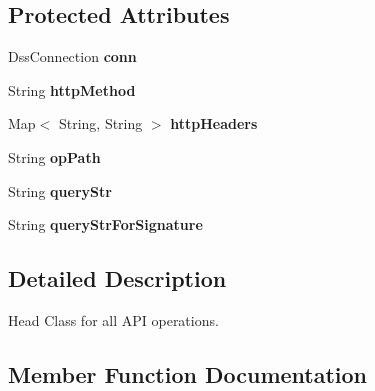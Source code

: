 \subsection*{Protected Attributes}
\begin{DoxyCompactItemize}
\item 
Dss\+Connection {\bfseries conn}\hypertarget{classorg_1_1jcs_1_1dss_1_1op_1_1Op_ab8a0bdf3a678af61b61af98ea5e26be7}{}\label{classorg_1_1jcs_1_1dss_1_1op_1_1Op_ab8a0bdf3a678af61b61af98ea5e26be7}

\item 
String {\bfseries http\+Method}\hypertarget{classorg_1_1jcs_1_1dss_1_1op_1_1Op_a34f4cea450ecada76563c4c9d533c339}{}\label{classorg_1_1jcs_1_1dss_1_1op_1_1Op_a34f4cea450ecada76563c4c9d533c339}

\item 
Map$<$ String, String $>$ {\bfseries http\+Headers}\hypertarget{classorg_1_1jcs_1_1dss_1_1op_1_1Op_a6db4bcd7b752123a1a85632000e86641}{}\label{classorg_1_1jcs_1_1dss_1_1op_1_1Op_a6db4bcd7b752123a1a85632000e86641}

\item 
String {\bfseries op\+Path}\hypertarget{classorg_1_1jcs_1_1dss_1_1op_1_1Op_a5f51c19ad6ad5d1b5b701409c824521c}{}\label{classorg_1_1jcs_1_1dss_1_1op_1_1Op_a5f51c19ad6ad5d1b5b701409c824521c}

\item 
String {\bfseries query\+Str}\hypertarget{classorg_1_1jcs_1_1dss_1_1op_1_1Op_a1705db02225f04d255eb4b5cbac99097}{}\label{classorg_1_1jcs_1_1dss_1_1op_1_1Op_a1705db02225f04d255eb4b5cbac99097}

\item 
String {\bfseries query\+Str\+For\+Signature}\hypertarget{classorg_1_1jcs_1_1dss_1_1op_1_1Op_aa6ea39ae1959b6d5cd939c48f22572a8}{}\label{classorg_1_1jcs_1_1dss_1_1op_1_1Op_aa6ea39ae1959b6d5cd939c48f22572a8}

\end{DoxyCompactItemize}


\subsection{Detailed Description}
Head Class for all A\+PI operations. 

\subsection{Member Function Documentation}
